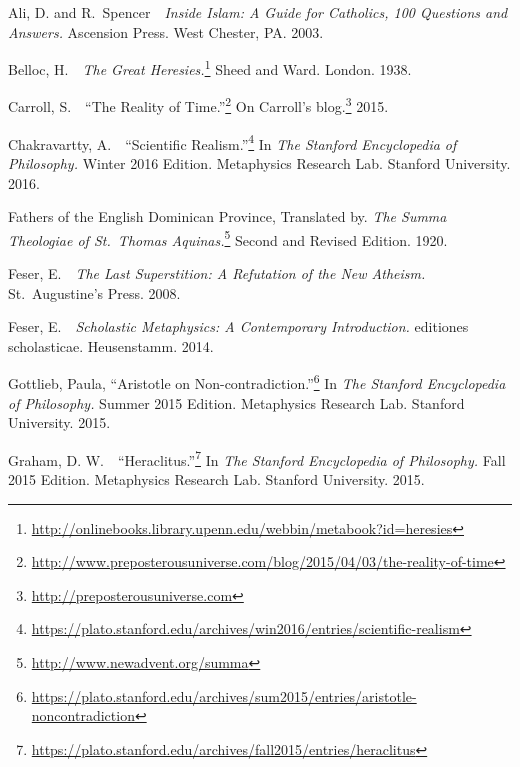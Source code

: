 \documentclass[twocolumn]{article}
\begin{document}
\begin{thebibliography}{}

   \begin{small}

      Ali, D. and R.~Spencer\ \ {\it Inside Islam: A Guide for Catholics, 100
      Questions and Answers.}  Ascension Press.  West Chester, PA.  2003.

      Belloc, H.\ \ {\it The Great Heresies.}\footnote{%
         \url{http://onlinebooks.library.upenn.edu/webbin/metabook?id=heresies}
      }
      Sheed and Ward.  London.  1938.

      Carroll, S.\ \ ``The Reality of Time.''\footnote{%
         \url{http://www.preposterousuniverse.com/blog/2015/04/03/the-reality-of-time}%
      }
      On Carroll's blog.\footnote{\url{http://preposterousuniverse.com}}  2015.

      Chakravartty, A.\ \ ``Scientific Realism.''\footnote{%
         \url{https://plato.stanford.edu/archives/win2016/entries/scientific-realism}%
      }
      In {\it The Stanford Encyclopedia of Philosophy.}  Winter 2016 Edition.
      Metaphysics Research Lab.  Stanford University.  2016.

      Fathers of the English Dominican Province, Translated by. {\it The
      Summa Theologiae of St.~Thomas Aquinas.}\footnote{%
         \url{http://www.newadvent.org/summa}%
      }
      Second and Revised Edition.  1920.

      Feser, E.\ \ {\it The Last Superstition: A Refutation of the New
      Atheism.}  St.~Augustine's Press.  2008.

      Feser, E.\ \ {\it Scholastic Metaphysics: A Contemporary Introduction.}
      editiones scholasticae.  Heusenstamm.  2014.

      Gottlieb, Paula, ``Aristotle on Non-contradiction.''\footnote{%
         \url{https://plato.stanford.edu/archives/sum2015/entries/aristotle-noncontradiction}%
      }
      In {\it The Stanford Encyclopedia of Philosophy.}  Summer 2015 Edition.
      Metaphysics Research Lab.  Stanford University.  2015.

      Graham, D. W.\ \ ``Heraclitus.''\footnote{%
         \url{https://plato.stanford.edu/archives/fall2015/entries/heraclitus}
      }
      In {\it The Stanford Encyclopedia of Philosophy.}  Fall 2015 Edition.
      Metaphysics Research Lab.  Stanford University.  2015.


\end{small}
\end{thebibliography}
\end{document}
